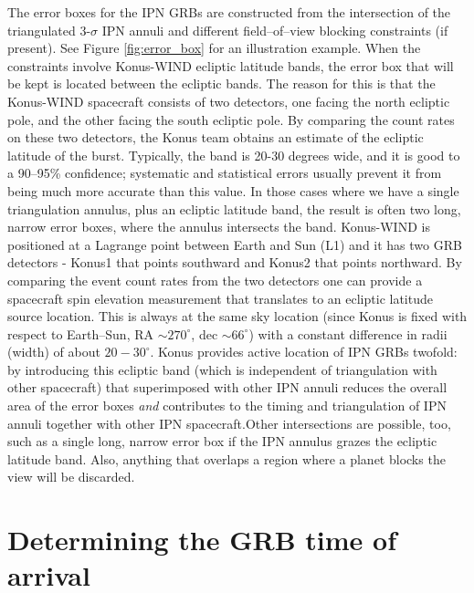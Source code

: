 The error boxes for the IPN GRBs are constructed from the intersection of the triangulated 3-$\sigma$ IPN annuli and different field--of--view blocking constraints (if present). See Figure \ref{fig:error_box} for an illustration example. When the constraints involve Konus-WIND ecliptic latitude bands, the error box that will be kept is located between the ecliptic bands. The reason for this is that the Konus-WIND spacecraft consists of two detectors, one facing the north ecliptic pole, and the other facing the south ecliptic pole. By comparing the count rates on these two detectors, the Konus team obtains an estimate of the ecliptic latitude of the burst. Typically, the band is 20-30 degrees wide, and it is good to a 90--95\% confidence; systematic and statistical errors usually prevent it from being much more accurate than this value. In those cases where we have a single triangulation annulus, plus an ecliptic latitude band, the result is often two long, narrow error boxes, where the annulus intersects the band. Konus-WIND is positioned at a Lagrange point between Earth and Sun (L1) and it has two GRB detectors - Konus1 that points southward and Konus2 that points northward. By comparing the event count rates from the two detectors one can provide a spacecraft spin elevation measurement that translates to an ecliptic latitude source location. This is always at the same sky location (since Konus is fixed with respect to Earth--Sun, RA $\sim 270^{\circ}$, dec $\sim 66^{\circ}$) with a constant difference in radii (width) of about $20-30^{\circ}$. Konus provides active location of IPN GRBs twofold: by introducing this ecliptic band (which is independent of triangulation with other spacecraft) that superimposed with other IPN annuli reduces the overall area of the error boxes \emph{and} contributes to the timing and triangulation of IPN annuli together with other IPN spacecraft.Other intersections are possible, too, such as a single long, narrow error box if the IPN annulus grazes the ecliptic latitude band. Also, anything that overlaps a region where a planet blocks the view will be discarded.

\section{Determining the GRB time of arrival}

